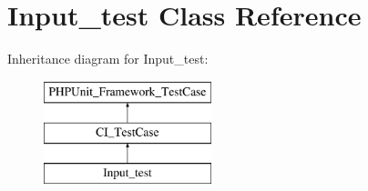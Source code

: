 \hypertarget{class_input__test}{}\section{Input\+\_\+test Class Reference}
\label{class_input__test}
Inheritance diagram for Input\+\_\+test\+:\begin{figure}[H]
\begin{center}
\leavevmode
\includegraphics[height=3.000000cm]{class_input__test}
\end{center}
\end{figure}
